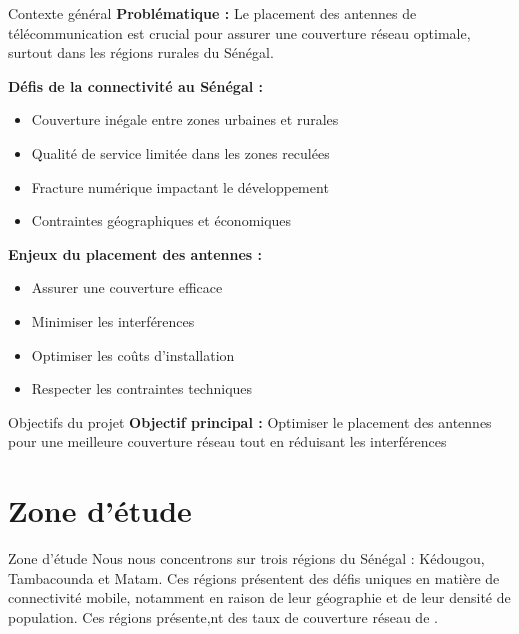 \documentclass[
  ignorenonframetext,
]{beamer}
\providecommand{\tightlist}{%
  \setlength{\itemsep}{0pt}\setlength{\parskip}{0pt}}
\begin{document}
\begin{frame}{Contexte général}
\label{contexte-guxe9nuxe9ral}
\textbf{Problématique :} Le placement des antennes de télécommunication
est crucial pour assurer une couverture réseau optimale, surtout dans
les régions rurales du Sénégal.

\textbf{Défis de la connectivité au Sénégal :}

\begin{itemize}
\tightlist
\item
  Couverture inégale entre zones urbaines et rurales
\item
  Qualité de service limitée dans les zones reculées
\item
  Fracture numérique impactant le développement
\item
  Contraintes géographiques et économiques
\end{itemize}

\textbf{Enjeux du placement des antennes :}

\begin{itemize}
\tightlist
\item
  Assurer une couverture efficace
\item
  Minimiser les interférences
\item
  Optimiser les coûts d'installation
\item
  Respecter les contraintes techniques
\end{itemize}
\end{frame}

\begin{frame}{Objectifs du projet}
\label{objectifs-du-projet}
\textbf{Objectif principal :} Optimiser le placement des antennes pour
une meilleure couverture réseau tout en réduisant les interférences
\end{frame}

\section{Zone d'étude}\label{zone-duxe9tude}

\begin{frame}{Zone d'étude}
Nous nous concentrons sur trois régions du Sénégal : Kédougou,
Tambacounda et Matam. Ces régions présentent des défis uniques en
matière de connectivité mobile, notamment en raison de leur géographie
et de leur densité de population. Ces régions présente,nt des taux de
couverture réseau de .
\end{frame}
\end{document}
